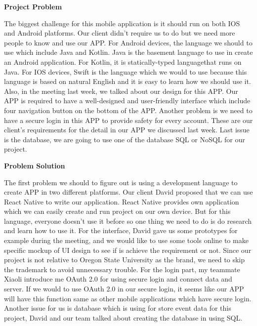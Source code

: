 \documentclass[10pt,letterpaper]{article}
\begin{document}
\newpage

\begin{center}
\large
\textbf{Project Problem}
\end{center}

The biggest challenge for this mobile application is it should run on both IOS and Android platforms. Our client didn’t require us to do but we need more people to know and use our APP. For Android devices, the language we should to use which include Java and Kotlin. Java is the basement language to use in create an Android application. For Kotlin, it is statically-typed languagethat runs on Java. For IOS devices, Swift is the language which we would to use because this language is based on natural English and it is easy to learn how we should use it. Also, in the meeting last week, we talked about our design for this APP. Our APP is required to have a well-designed and user-friendly interface which include four navigation button on the bottom of the APP. Another problem is we need to have a secure login in this APP to provide safety for every account. These are our client’s requirements for the detail in our APP we discussed last week. Last issue is the database, we are going to use one of the database SQL or NoSQL for our project. \\

\begin{center}
\large
\textbf{Problem Solution}
\end{center}
The first problem we should to figure out is using a development language to create APP in two different platforms. Our client David proposed that we can use React Native to write our application. React Native provides own application which we can easily create and run project on our own device. But for this language, everyone doesn’t use it before so one thing we need to do is do research and learn how to use it. For the interface, David gave us some prototypes for example during the meeting, and we would like to use some tools online to make specific mockup of UI design to see if is achieve the requirement or not. Since our project is not relative to Oregon State University as the brand, we need to skip the trademark to avoid unnecessary trouble. For the login part, my teammate Xiaoli introduce me OAuth 2.0 for using secure login and connect data and server. If we would to use OAuth 2.0 in our secure login, it seems like our APP will have this function same as other mobile applications which have secure login. Another issue for us is database which is using for store event data for this project, David and our team talked about creating the database in using SQL.\\
\end{document}
